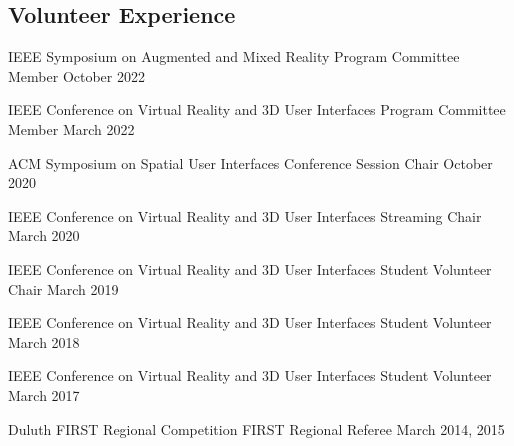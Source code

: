 
\begin{cventries}
  \vspace{-.75cm}    
  \subsection*{Volunteer Experience}
  
  \cventry
    {IEEE Symposium on Augmented and Mixed Reality} %
    {Program Committee Member} %
    {October 2022} %
    {} %
    {}
    \vspace{-0.15in}
  
  \cventry
    {IEEE Conference on Virtual Reality and 3D User Interfaces} %
    {Program Committee Member} %
    {March 2022} %
    {} %
    {}
    \vspace{-0.15in}
    
  \cventry
    {ACM Symposium on Spatial User Interfaces} %
    {Conference Session Chair} %
    {October 2020} %
    {} %
    {}
    \vspace{-0.15in}

  \cventry
    {IEEE Conference on Virtual Reality and 3D User Interfaces} %
    {Streaming Chair} %
    {March 2020} %
    {} %
    {}
    \vspace{-0.15in}

  \cventry
    {IEEE Conference on Virtual Reality and 3D User Interfaces} %
    {Student Volunteer Chair} %
    {March 2019} %
    {} %
    {}
    \vspace{-0.15in}
    
  \cventry
    {IEEE Conference on Virtual Reality and 3D User Interfaces} %
    {Student Volunteer} %
    {March 2018} %
    {} %
    {}
    \vspace{-0.15in}
    
  \cventry
    {IEEE Conference on Virtual Reality and 3D User Interfaces} %
    {Student Volunteer} %
    {March 2017} %
    {} %
    {}
    \vspace{-0.15in}
    
  \cventry
    {Duluth FIRST Regional Competition} %
    {FIRST Regional Referee} %
    {March 2014, 2015} %
    {} %
    {}
    \vspace{-0.15in}
    

\end{cventries}
